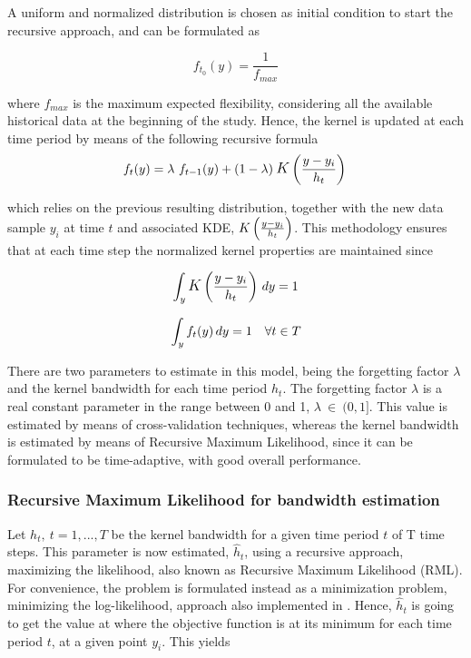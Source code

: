 A uniform and normalized distribution is chosen as initial condition to start the recursive approach, and can be formulated as

\begin{equation}
    f_{t_{0}}(y) = \frac{1}{f_{max}}
\end{equation}

where $f_{max}$ is the maximum expected flexibility, considering all the available historical data at the beginning of the study. Hence, the kernel is updated at each time period by means of the following recursive formula 
\begin{equation} \label{eq:recursive_formula}
    f_{t}(y) = \lambda\ f_{t-1}(y) + (1-\lambda) \: \mathlarger{K}\left(\frac{y - y_{i}}{h_{t}}\right) \\
\end{equation}

which relies on the previous resulting distribution, together with the new data sample $y_{i}$ at time $t$ and associated KDE, $\mathlarger{K}\left(\frac{y - y_{i}}{h_{t}}\right)$. This methodology ensures that at each time step the normalized kernel properties are maintained since

\begin{equation}
  \int_{y} \mathlarger{K}\left(\frac{y - y_{i}}{h_{t}}\right) \, dy = 1 \\  
\end{equation}

\begin{equation}
  \int_{y} f_{t}(y) \, dy = 1  \quad \forall t \in T \\  
\end{equation}

There are two parameters to estimate in this model, being the forgetting factor $\lambda$ and the kernel bandwidth for each time period ${h}_{t}$. The forgetting factor $\lambda$ is a real constant parameter in the range between 0 and 1, $\lambda\ \in\ (0,1]$. This value is estimated by means of cross-validation techniques, whereas the kernel bandwidth is estimated by means of Recursive Maximum Likelihood, since it can be formulated to be time-adaptive, with good overall performance. 


\subsubsection{Recursive Maximum Likelihood for bandwidth estimation}

Let ${h}_{t}, \ t=1,...,T$ be the kernel bandwidth for a given time period $t$ of T time steps. This parameter is now estimated, $\hat{h}_{t}$, using a recursive approach, maximizing the likelihood, also known as Recursive Maximum Likelihood (RML). For convenience, the problem is formulated instead as a minimization problem, minimizing the log-likelihood, approach also implemented in \cite{Pinson2009, Pinson_Madsen_2012}. Hence, $\hat{h}_{t}$ is going to get the value at where the objective function is at its minimum for each time period $t$, at a given point $y_i$. This yields


